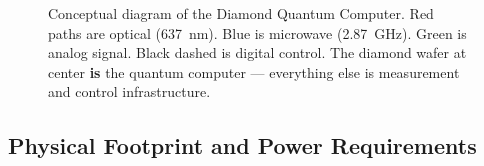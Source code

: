 \documentclass[11pt,a4paper,openany]{book}
\begin{document}
\begin{figure}[H]
\caption{Conceptual diagram of the Diamond Quantum Computer. Red paths are optical (637~nm). Blue is microwave (2.87~GHz). Green is analog signal. Black dashed is digital control. The diamond wafer at center \textbf{is} the quantum computer --- everything else is measurement and control infrastructure.}
\label{fig:concept}
\end{figure}

\subsection{Physical Footprint and Power Requirements}
\end{document}
